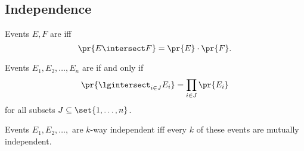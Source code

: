 \documentclass[handout]{mcs}
\begin{document}
{\subsection*{Independence}

Events $E,F$ are  iff
\[
\pr{E \intersect F} = \pr{E}\cdot \pr{F}.
\]

Events $E_1, E_2, \dots, E_n$ are  if and only
if
%
\[
\pr{\lgintersect_{i \in J} E_i} = \prod_{i \in J} \pr{E_i}
\]
for all subsets $J \subseteq \set{1,\dots,n}$.

Events $E_1, E_2, \dots,$ are $k$-way independent iff every $k$
of these events are mutually independent.
}
\end{document}
